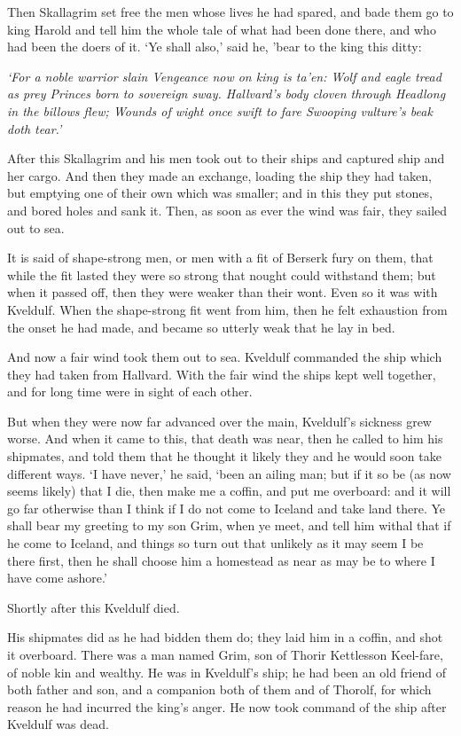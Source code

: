 Then Skallagrim set free the men whose lives he had spared, and bade them go to king Harold and tell him the whole tale of what had been done there, and who had been the doers of it. `Ye shall also,' said he, 'bear to the king this ditty:

{\centering\emph{
	`For a noble warrior slain
	Vengeance now on king is ta'en:
	Wolf and eagle tread as prey
	Princes born to sovereign sway.
	Hallvard's body cloven through
	Headlong in the billows flew;
	Wounds of wight once swift to fare
	Swooping vulture's beak doth tear.'
}}


After this Skallagrim and his men took out to their ships and captured ship and her cargo. And then they made an exchange, loading the ship they had taken, but emptying one of their own which was smaller; and in this they put stones, and bored holes and sank it. Then, as soon as ever the wind was fair, they sailed out to sea.

It is said of shape-strong men, or men with a fit of Berserk fury on them, that while the fit lasted they were so strong that nought could withstand them; but when it passed off, then they were weaker than their wont. Even so it was with Kveldulf. When the shape-strong fit went from him, then he felt exhaustion from the onset he had made, and became so utterly weak that he lay in bed.

And now a fair wind took them out to sea. Kveldulf commanded the ship which they had taken from Hallvard. With the fair wind the ships kept well together, and for long time were in sight of each other.

But when they were now far advanced over the main, Kveldulf's sickness grew worse. And when it came to this, that death was near, then he called to him his shipmates, and told them that he thought it likely they and he would soon take different ways. `I have never,' he said, `been an ailing man; but if it so be (as now seems likely) that I die, then make me a coffin, and put me overboard: and it will go far otherwise than I think if I do not come to Iceland and take land there. Ye shall bear my greeting to my son Grim, when ye meet, and tell him withal that if he come to Iceland, and things so turn out that unlikely as it may seem I be there first, then he shall choose him a homestead as near as may be to where I have come ashore.'

Shortly after this Kveldulf died.

His shipmates did as he had bidden them do; they laid him in a coffin, and shot it overboard. There was a man named Grim, son of Thorir Kettlesson Keel-fare, of noble kin and wealthy. He was in Kveldulf's ship; he had been an old friend of both father and son, and a companion both of them and of Thorolf, for which reason he had incurred the king's anger. He now took command of the ship after Kveldulf was dead.

